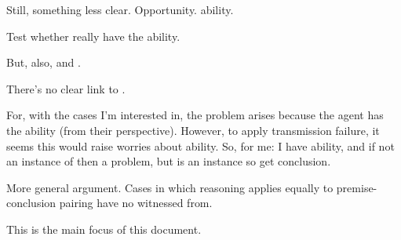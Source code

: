 \begin{note}
  Still, something less clear.
  Opportunity.
   ability.

  Test whether really have the \abspec{} ability.

  But, also, \abspec{} and \abspec{}.
\end{note}

\begin{note}
  \color{red}
  There's no clear link to \citeauthor{Wright:2011wn}.

  For, with the cases I'm interested in, the problem arises because the agent has the \abgen{} ability (from their perspective).
  However, to apply transmission failure, it seems this would raise worries about ability.
  So, for me:
  I have \abgen{} ability, and if not an instance of \abgen{} then a problem, but is an instance so get conclusion.
\end{note}

\begin{note}
  More general argument.
  Cases in which reasoning applies equally to premise-conclusion pairing have no witnessed from.

  This is the main focus of this document.
\end{note}


